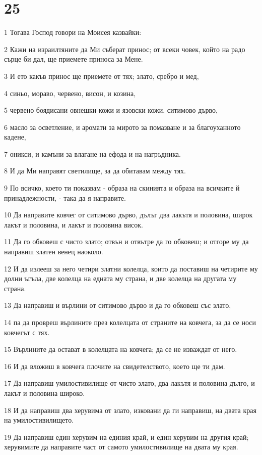 \chapter{25}

\par 1 Тогава Господ говори на Моисея казвайки:
\par 2 Кажи на израилтяните да Ми съберат принос; от всеки човек, който на радо сърце би дал, ще приемете приноса за Мене.
\par 3 И ето какъв принос ще приемете от тях; злато, сребро и мед,
\par 4 синьо, мораво, червено, висон, и козина,
\par 5 червено боядисани овнешки кожи и язовски кожи, ситимово дърво,
\par 6 масло за осветление, и аромати за мирото за помазване и за благоуханното кадене,
\par 7 оникси, и камъни за влагане на ефода и на нагръдника.
\par 8 И да Ми направят светилище, за да обитавам между тях.
\par 9 По всичко, което ти показвам - образа на скинията и образа на всичките й принадлежности, - така да я направите.
\par 10 Да направите ковчег от ситимово дърво, дълъг два лакътя и половина, широк лакът и половина, и лакът и половина висок.
\par 11 Да го обковеш с чисто злато; отвън и отвътре да го обковеш; и отгоре му да направиш златен венец наоколо.
\par 12 И да излееш за него четири златни колелца, които да поставиш на четирите му долни ъгъла, две колелца на едната му страна, и две колелца на другата му страна.
\par 13 Да направиш и върлини от ситимово дърво и да го обковеш със злато,
\par 14 па да провреш върлините през колелцата от страните на ковчега, за да се носи ковчегът с тях.
\par 15 Върлините да остават в колелцата на ковчега; да се не изваждат от него.
\par 16 И да вложиш в ковчега плочите на свидетелството, което ще ти дам.
\par 17 Да направиш умилостивилище от чисто злато, два лакътя и половина дълго, и лакът и половина широко.
\par 18 И да направиш два херувима от злато, изковани да ги направиш, на двата края на умилостивилището.
\par 19 Да направиш един херувим на единия край, и един херувим на другия край; херувимите да направите част от самото умилостивилище на двата му края.

